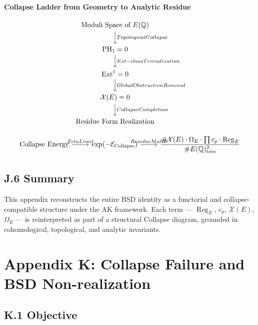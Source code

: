 \documentclass[11pt]{article}
\newcommand{\Sha}{\mathcal{X}}
\begin{document}
\begin{center}
\textbf{Collapse Ladder from Geometry to Analytic Residue}
\end{center}

\[
\begin{tikzcd}
\text{Moduli Space of } E(\mathbb{Q}) \arrow[d, "Topological Collapse"] \\
\mathrm{PH}_1 = 0 \arrow[d, "Ext-class Trivialization"] \\
\mathrm{Ext}^1 = 0 \arrow[d, "Global Obstruction Removal"] \\
\Sha(E) = 0 \arrow[d, "Collapse Completion"] \\
\text{Residue Form Realization}
\end{tikzcd}
\]

\[
\begin{tikzcd}
\text{Collapse Energy} \arrow[r, "Zeta Limit"] & \exp(-\mathcal{E}_{\text{Collapse}}) \arrow[r, "Residue Match"] & \dfrac{\#\Sha(E) \cdot \Omega_E \cdot \prod c_p \cdot \operatorname{Reg}_E}{\# E(\mathbb{Q})_\text{tors}^2}
\end{tikzcd}
\]

\subsection*{J.6 Summary}

This appendix reconstructs the entire BSD identity as a functorial and collapse-compatible structure under the AK framework. Each term --- $\operatorname{Reg}_E$, $c_p$, $\Sha(E)$, $\Omega_E$ --- is reinterpreted as part of a structural Collapse diagram, grounded in cohomological, topological, and analytic invariants.




\section*{Appendix K: Collapse Failure and BSD Non-realization}

\subsection*{K.1 Objective}
\end{document}
